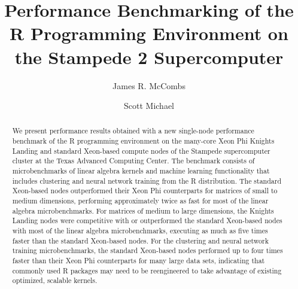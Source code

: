\documentclass[sigconf]{acmart}
\begin{document}
\title{Performance Benchmarking of the R Programming Environment on the Stampede 2 Supercomputer}


\author{James R. McCombs}

\author{Scott Michael}

\renewcommand{\shortauthors}{J.R. McCombs et al.}


\begin{abstract}

We present performance results obtained with a new single-node
performance benchmark of the R programming environment on
the many-core Xeon Phi Knights Landing and standard Xeon-based
compute nodes of the Stampede supercomputer cluster at the Texas
Advanced Computing Center.  The benchmark consists of
microbenchmarks of linear algebra kernels and machine learning
functionality that includes clustering and neural network training
from the R distribution.  The standard Xeon-based nodes outperformed
their Xeon Phi counterparts for matrices of small to medium
dimensions, performing approximately twice as fast for most of the
linear algebra microbenchmarks.  For matrices of medium to large
dimensions, the Knights Landing nodes were
competitive with or outperformed the standard Xeon-based nodes with
most of the linear algebra microbenchmarks, executing as much as five
times faster than the standard Xeon-based nodes.  For the clustering and neural
network training microbenchmarks, the standard Xeon-based nodes
performed up to four times faster than their Xeon Phi counterparts
for many large data sets, indicating that commonly used R packages
may need to be reengineered to take advantage of existing optimized,
scalable kernels.

\end{abstract}
\end{document}
